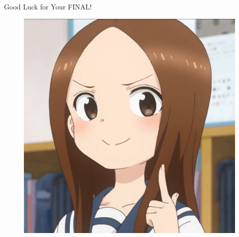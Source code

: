 \documentclass{beamer}
\begin{document}
\begin{frame}
\Huge{\centerline{Good Luck for Your FINAL!}}
\begin{figure}[H]
    \centering
    \includegraphics[width=0.6\linewidth]{IMG_20200921_195647.jpg}
\end{figure}

\end{frame}

\end{document}
